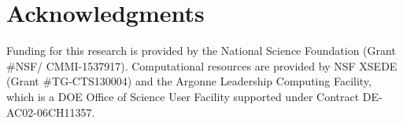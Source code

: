 \documentclass[12pt,authoryear]{elsarticle}
\begin{document}
\section{Acknowledgments}
\label{sec:acknowledgement}
Funding for this research is provided by the National Science Foundation (Grant
\#NSF/ CMMI-1537917). Computational resources are provided by NSF XSEDE (Grant
\#TG-CTS130004) and the Argonne Leadership Computing Facility, which is a DOE
Office of Science User Facility supported under Contract DE-AC02-06CH11357.


 

\end{document}
